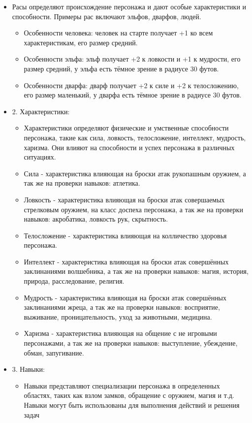 \begin{itemize}
\begin{itemize}
		\item Расы определяют происхождение персонажа и дают особые характеристики и способности. Примеры рас включают эльфов, дварфов, людей.
			\begin{itemize}
			\item Особенности человека: человек на старте получает +1 ко всем характеристикам, его размер средний.
			\item Особенности эльфа: эльф получает +2 к ловкости и +1 к мудрости, его размер средний, у эльфа есть тёмное зрение в радиусе 30 футов.
			\item Особенности дварфа: дварф получает +2 к силе и +2 к телосложению, его размер маленький, у дварфа есть тёмное зрение в радиусе 30 футов.
			\end{itemize}
		\item 2. Характеристики:
		\begin{itemize}
			\item Характеристики определяют физические и умственные способности персонажа, такие как сила, ловкость, телосложение, интеллект, мудрость, харизма. Они влияют на способности и успех персонажа в различных ситуациях.
			\item Сила - характеристика влияющая на броски атак рукопашным оружием, а так же на проверки навыков: атлетика.
			\item Ловкость - характеристика влияющая на броски атак совершаемых стрелковым оружием, на класс доспеха персонажа, а так же на проверки навыков: акробатика, ловкость рук, скрытность.
			\item Телосложение - характеристика влияющая на колличество здоровья персонажа.
			\item Интеллект - характеристика влияющая на броски атак совершённых заклинаниями волшебника, а так же на проверки навыков: магия, история, природа, расследование, религия.
			\item Мудрость - характеристика влияющая на броски атак  совершённых заклинаниями жреца, а так же на проверки навыков: восприятие, выживание, проницательность, уход за животными, медицина.
			\item Харизма - характеристика влияющая на общение с не игровыми персонажами, а так же на проверки навыков: выступление, убеждение, обман, запугивание.
		\end{itemize}
		\item 3. Навыки:
		\begin{itemize}
			\item Навыки представляют специализации персонажа в определенных областях, таких как взлом замков, обращение с оружием, магия и т.д. Навыки могут быть использованы для выполнения действий и решения задач

\end{itemize}
\end{itemize}
\end{itemize}
